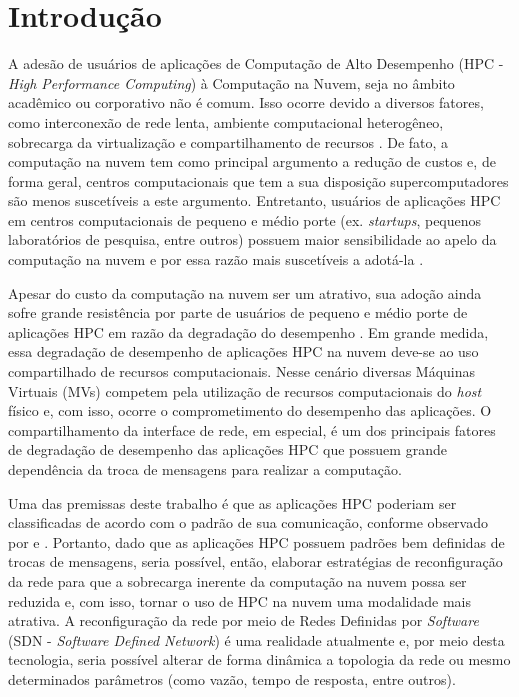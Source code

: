 \documentclass[10pt, conference, compsocconf]{IEEEtran}
\begin{document}
\section{Introdução}
A adesão de usuários de aplicações de Computação de Alto Desempenho (HPC - \textit{High Performance Computing}) à Computação na Nuvem, seja no âmbito acadêmico ou corporativo não é comum. Isso ocorre devido a diversos fatores, como interconexão de rede lenta, ambiente computacional heterogêneo, sobrecarga da virtualização e compartilhamento de recursos \cite{Gupta:2014}. De fato, a computação na nuvem tem como principal argumento a redução de custos e, de forma geral, centros computacionais que tem a sua disposição supercomputadores são menos suscetíveis a este argumento. Entretanto, usuários de aplicações HPC em centros computacionais de pequeno e médio porte (ex. \textit{startups}, pequenos laboratórios de pesquisa, entre outros) possuem maior sensibilidade ao apelo da computação na nuvem e por essa razão mais suscetíveis a adotá-la \cite{Gupta:2014} \cite{Gupta:2013}.

Apesar do custo da computação na nuvem ser um atrativo, sua adoção ainda sofre grande resistência por parte de usuários de pequeno e médio porte de aplicações HPC em razão da degradação do desempenho \cite{Niu:2013}. Em grande medida, essa degradação de desempenho de aplicações HPC na nuvem deve-se ao uso compartilhado de recursos computacionais. Nesse cenário diversas Máquinas Virtuais (MVs) competem pela utilização de recursos computacionais do \textit{host} físico e, com isso, ocorre o comprometimento do desempenho das aplicações. O compartilhamento da interface de rede, em especial, é um dos principais fatores de degradação de desempenho \cite{Gupta:2014} das aplicações HPC que possuem grande dependência da troca de mensagens para realizar a computação.

Uma das premissas deste trabalho é que as aplicações HPC poderiam ser classificadas de acordo com o padrão de sua comunicação, conforme observado por \citet{Gupta:2014} e \citet{Asanovic:2006}. Portanto, dado que as aplicações HPC possuem padrões bem definidas de trocas de mensagens, seria possível, então, elaborar estratégias de reconfiguração da rede para que a sobrecarga inerente da computação na nuvem possa ser reduzida e, com isso, tornar o uso de HPC na nuvem uma modalidade mais atrativa. A reconfiguração da rede por meio de Redes Definidas por \textit{Software} (SDN - \textit {Software Defined Network}) \cite{fundation2012software} é uma realidade atualmente e, por meio desta tecnologia, seria possível alterar de forma dinâmica a topologia da rede ou mesmo determinados parâmetros (como vazão, tempo de resposta, entre outros).
\end{document}
